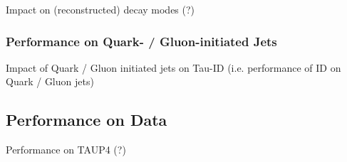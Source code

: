 
Impact on (reconstructed) decay modes (?)

\subsubsection{Performance on Quark- / Gluon-initiated Jets}
\label{sec:bdt_perf_quark_gluon}

Impact of Quark / Gluon initiated jets on Tau-ID (i.e. performance of ID
on Quark / Gluon jets)

\subsection{Performance on Data}
\label{sec:bdt_perf_data}

Performance on TAUP4 (?)

